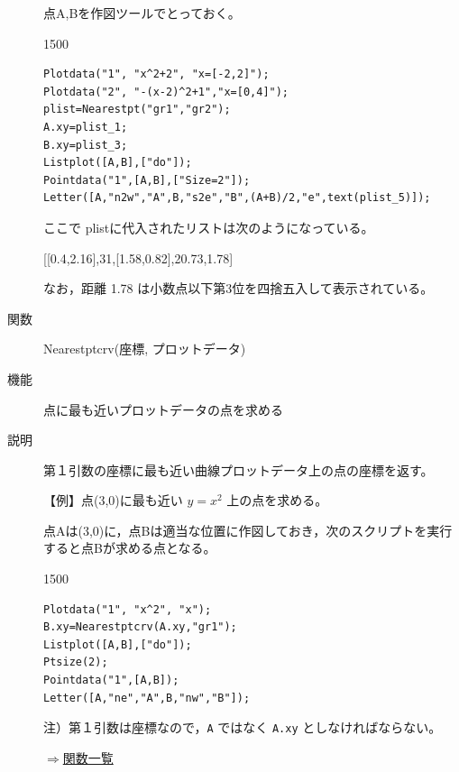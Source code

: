 \documentclass[papersize,a4paper,10pt,uplatex]{jsarticle}
\begin{document}
\begin{description}
点A,Bを作図ツールでとっておく。

\begin{layer}{150}{0}
\end{layer}

\begin{verbatim}
Plotdata("1", "x^2+2", "x=[-2,2]");
Plotdata("2", "-(x-2)^2+1","x=[0,4]");
plist=Nearestpt("gr1","gr2");
A.xy=plist_1;
B.xy=plist_3;
Listplot([A,B],["do"]);
Pointdata("1",[A,B],["Size=2"]);
Letter([A,"n2w","A",B,"s2e","B",(A+B)/2,"e",text(plist_5)]);
\end{verbatim}

ここで plistに代入されたリストは次のようになっている。

\hspace{10mm}[[0.4,2.16],31,[1.58,0.82],20.73,1.78] 

なお，距離 1.78 は小数点以下第3位を四捨五入して表示されている。

\vspace{\baselineskip}
\hypertarget{nearestptcrv}{}
\item[関数]Nearestptcrv(座標, プロットデータ)
\item[機能]点に最も近いプロットデータの点を求める
\item[説明]第１引数の座標に最も近い曲線プロットデータ上の点の座標を返す。

\vspace{\baselineskip}
【例】点(3,0)に最も近い $y=x^2$ 上の点を求める。

点Aは(3,0)に，点Bは適当な位置に作図しておき，次のスクリプトを実行すると点Bが求める点となる。

\begin{layer}{150}{0}
\end{layer}

\begin{verbatim}
Plotdata("1", "x^2", "x");
B.xy=Nearestptcrv(A.xy,"gr1");
Listplot([A,B],["do"]);
Ptsize(2);
Pointdata("1",[A,B]);
Letter([A,"ne","A",B,"nw","B"]);
\end{verbatim}

\vspace{\baselineskip}
\vspace{\baselineskip}
注）第１引数は座標なので，\verb|A| ではなく \verb|A.xy| としなければならない。

\begin{flushright}\hyperlink{functionlist}{$\Rightarrow$関数一覧}\end{flushright}


\end{description}
\end{document}
